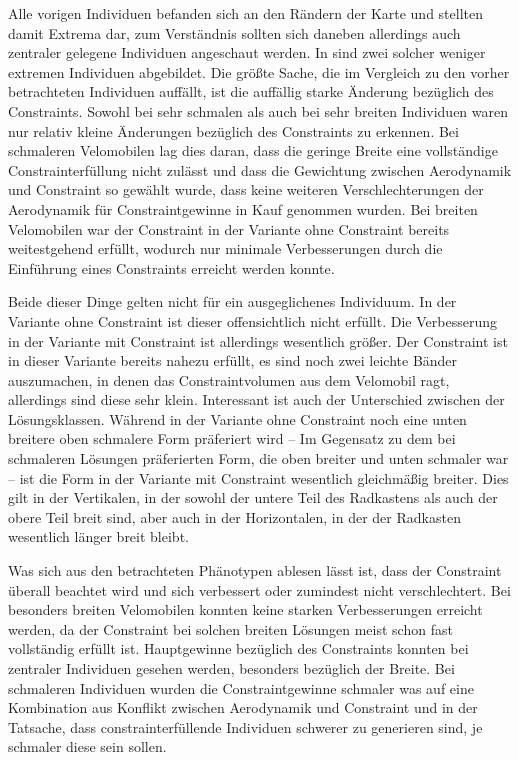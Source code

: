 Alle vorigen Individuen befanden sich an den Rändern der Karte und stellten damit Extrema dar, zum Verständnis sollten sich daneben allerdings auch zentraler gelegene Individuen angeschaut werden.
In  sind zwei solcher weniger extremen Individuen abgebildet.
Die größte Sache, die im Vergleich zu den vorher betrachteten Individuen auffällt, ist die auffällig starke Änderung bezüglich des Constraints.
Sowohl bei sehr schmalen als auch bei sehr breiten Individuen waren nur relativ kleine Änderungen bezüglich des Constraints zu erkennen.
Bei schmaleren Velomobilen lag dies daran, dass die geringe Breite eine vollständige Constrainterfüllung nicht zulässt und dass die Gewichtung zwischen Aerodynamik und Constraint so gewählt wurde, dass keine weiteren Verschlechterungen der Aerodynamik für Constraintgewinne in Kauf genommen wurden.
Bei breiten Velomobilen war der Constraint in der Variante ohne Constraint bereits weitestgehend erfüllt, wodurch nur minimale Verbesserungen durch die Einführung eines Constraints erreicht werden konnte.

Beide dieser Dinge gelten nicht für ein ausgeglichenes Individuum.
In der Variante ohne Constraint ist dieser offensichtlich nicht erfüllt.
Die Verbesserung in der Variante mit Constraint ist allerdings wesentlich größer.
Der Constraint ist in dieser Variante bereits nahezu erfüllt, es sind noch zwei leichte Bänder auszumachen, in denen das Constraintvolumen aus dem Velomobil ragt, allerdings sind diese sehr klein.
Interessant ist auch der Unterschied zwischen der Lösungsklassen.
Während in der Variante ohne Constraint noch eine unten breitere oben schmalere Form präferiert wird -- Im Gegensatz zu dem bei schmaleren Lösungen präferierten Form, die oben breiter und unten schmaler war -- ist die Form in der Variante mit Constraint wesentlich gleichmäßig breiter.
Dies gilt in der Vertikalen, in der sowohl der untere Teil des Radkastens als auch der obere Teil breit sind, aber auch in der Horizontalen, in der der Radkasten wesentlich länger breit bleibt.

Was sich aus den betrachteten Phänotypen ablesen lässt ist, dass der Constraint überall beachtet wird und sich verbessert oder zumindest nicht verschlechtert.
Bei besonders breiten Velomobilen konnten keine starken Verbesserungen erreicht werden, da der Constraint bei solchen breiten Lösungen meist schon fast vollständig erfüllt ist.
Hauptgewinne bezüglich des Constraints konnten bei zentraler Individuen gesehen werden, besonders bezüglich der Breite.
Bei schmaleren Individuen wurden die Constraintgewinne schmaler was auf eine Kombination aus Konflikt zwischen Aerodynamik und Constraint und in der Tatsache, dass constrainterfüllende Individuen schwerer zu generieren sind, je schmaler diese sein sollen.



